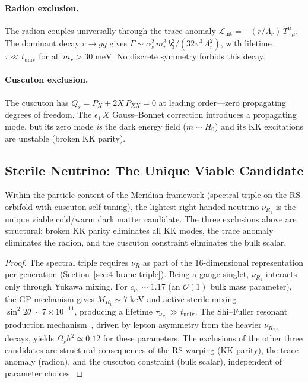\paragraph{Radion exclusion.} The radion couples universally through the trace anomaly $\mathcal{L}_{\mathrm{int}} = -(r/\Lambda_r)\, T^\mu{}_\mu$. The dominant decay $r \to gg$ gives $\Gamma \sim \alpha_s^2\, m_r^3\, b_3^2/(32\pi^3\, \Lambda_r^2)$, with lifetime $\tau \ll t_{\mathrm{univ}}$ for all $m_r > 30\;\mathrm{meV}$. No discrete symmetry forbids this decay.

\paragraph{Cuscuton exclusion.} The cuscuton has $Q_s = P_X + 2X\, P_{XX} = 0$ at leading order---zero propagating degrees of freedom. The $\epsilon_1\, X$ Gauss--Bonnet correction introduces a propagating mode, but its zero mode \emph{is} the dark energy field ($m \sim H_0$) and its KK excitations are unstable (broken KK parity).

\subsection{Sterile Neutrino: The Unique Viable Candidate}
\label{sec:4-dm-sterile}

\begin{theorem}\label{thm:4-dm}
Within the particle content of the Meridian framework (spectral triple on the RS orbifold with cuscuton self-tuning), the lightest right-handed neutrino $\nu_{R_1}$ is the unique viable cold/warm dark matter candidate. The three exclusions above are structural: broken KK parity eliminates all KK modes, the trace anomaly eliminates the radion, and the cuscuton constraint eliminates the bulk scalar.
\end{theorem}

\begin{proof}
The spectral triple requires $\nu_R$ as part of the 16-dimensional representation per generation (Section~\ref{sec:4-brane-triple}). Being a gauge singlet, $\nu_{R_1}$ interacts only through Yukawa mixing. For $c_{\nu_1} \sim 1.17$ (an $\mathcal{O}(1)$ bulk mass parameter), the GP mechanism gives $M_{R_1} \sim 7\;\mathrm{keV}$ and active-sterile mixing $\sin^2 2\theta \sim 7 \times 10^{-11}$, producing a lifetime $\tau_{\nu_{R_1}} \gg t_{\mathrm{univ}}$. The Shi--Fuller resonant production mechanism~\cite{ch4:ShiFuller1999}, driven by lepton asymmetry from the heavier $\nu_{R_{2,3}}$ decays, yields $\Omega_s h^2 \simeq 0.12$ for these parameters. The exclusions of the other three candidates are structural consequences of the RS warping (KK parity), the trace anomaly (radion), and the cuscuton constraint (bulk scalar), independent of parameter choices.
\end{proof}

